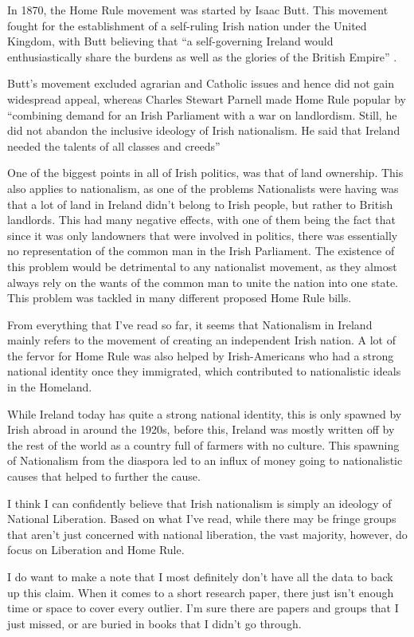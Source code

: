 \documentclass[12pt]{article}
\begin{document}
    \par In 1870, the Home Rule movement was started by Isaac Butt. This movement fought for the establishment of a self-ruling Irish nation under the United Kingdom, with Butt believing that ``a self-governing Ireland would enthusiastically share the burdens as well as the glories of the British Empire'' \autocite[8]{Components}.
    \par Butt's movement excluded agrarian and Catholic issues and hence did not gain widespread appeal, whereas Charles Stewart Parnell made Home Rule popular by ``combining demand for an Irish Parliament with a war on landlordism. Still, he did not abandon the inclusive ideology of Irish nationalism. He said that Ireland needed the talents of all classes and creeds'' \autocite[8]{Components}
    \par One of the biggest points in all of Irish politics, was that of land ownership. This also applies to nationalism, as one of the problems Nationalists were having was that a lot of land in Ireland didn't belong to Irish people, but rather to British landlords.
    This had many negative effects, with one of them being the fact that since it was only landowners that were involved in politics, there was essentially no representation of the common man in the Irish Parliament.
    The existence of this problem would be detrimental to any nationalist movement, as they almost always rely on the wants of the common man to unite the nation into one state. This problem was tackled in many different proposed Home Rule bills.
    \par From everything that I've read so far, it seems that Nationalism in Ireland mainly refers to the movement of creating an independent Irish nation.
    A lot of the fervor for Home Rule was also helped by Irish-Americans who had a strong national identity once they immigrated, which contributed to nationalistic ideals in the Homeland. 
    \par While Ireland today has quite a strong national identity, this is only spawned by Irish abroad in around the 1920s, before this, Ireland was mostly written off by the rest of the world as a country full of farmers with no culture.
    This spawning of Nationalism from the diaspora led to an influx of money going to nationalistic causes that helped to further the cause.
    \par I think I can confidently believe that Irish nationalism is simply an ideology of National Liberation.
    Based on what I've read, while there may be fringe groups that aren't just concerned with national liberation, the vast majority, however, do focus on Liberation and Home Rule. 
    \par I do want to make a note that I most definitely don't have all the data to back up this claim. When it comes to a short research paper, there just isn't enough time or space to cover every outlier. I'm sure there are papers and groups that I just missed, or are buried in books that I didn't go through.
    \newpage
\nocite{*}
\printbibliography
\end{document}
